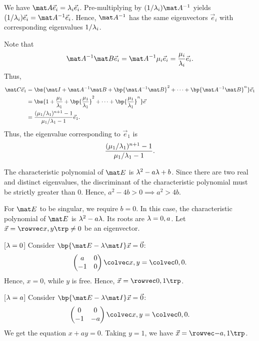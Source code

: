 \begin{solution}
    \begin{ppart}
        \begin{psubpart}
            We have $\mat A \vec e_i = \l_i \vec e_i$. Pre-multiplying by $(1/\l_i) \mat A^{-1}$ yields $(1/\l_i) \vec e_i = \mat A^{-1} \vec e_i$. Hence, $\mat A^{-1}$ has the same eigenvectors $\vec e_i$ with corresponding eigenvalues $1/\lambda_i$.
        \end{psubpart}
        \begin{psubpart}
            Note that \[\mat A^{-1} \mat B \vec e_i = \mat A^{-1} \m_i \vec e_i = \frac{\m_i}{\l_i} \vec e_i.\] Thus,
            \begin{align*}
                \mat C \vec e_1 &= \bs{\mat I + \mat A^{-1} \mat B + \bp{\mat A^{-1} \mat B}^2 + \dots + \bp{\mat A^{-1} \mat B}^n} \vec e_1\\
                &= \bs{1 + \frac{\m_1}{\l_1} + \bp{\frac{\m_1}{\l_1}}^2 + \dots + \bp{\frac{\m_1}{\l_1}}^n} \vec e\\
                &= \frac{(\m_1/\l_1)^{n+1} - 1}{\m_1/\l_1 - 1} \vec e_1.
            \end{align*}
            Thus, the eigenvalue corresponding to $\vec e_1$ is \[\frac{(\mu_1/\lambda_1)^{n+1} - 1}{\mu_1/\lambda_1 - 1}.\]
        \end{psubpart}
    \end{ppart}
    \begin{ppart}
        \begin{psubpart}
            The characteristic polynomial of $\mat E$ is $\lambda^2 - a \lambda + b$. Since there are two real and distinct eigenvalues, the discriminant of the characteristic polynomial must be strictly greater than 0. Hence, $a^2 - 4b > 0 \implies a^2 > 4b$.
        \end{psubpart}
        \begin{psubpart}
            For $\mat E$ to be singular, we require $b = 0$. In this case, the characteristic polynomial of $\mat E$ is $\lambda^2 - a\lambda$. Its roots are $\lambda = 0, a$. Let $\vec x = \cveciix{x}{y} \neq 0$ be an eigenvector.

            [$\lambda = 0$] Consider $\bp{\mat E - \l \mat I} \vec x = \vec 0$: \[\begin{pmatrix}a & 0 \\ -1 & 0 \end{pmatrix}\cvecii{x}{y} = \cvecii00.\] Hence, $x = 0$, while $y$ is free. Hence, $\vec x = \cveciix01$.

            [$\lambda = a$] Consider $\bp{\mat E - \l \mat I} \vec x = \vec 0$: \[\begin{pmatrix}0 & 0 \\ -1 & -a\end{pmatrix} \cvecii{x}{y} = \cvecii00.\] We get the equation $x + ay = 0$. Taking $y = 1$, we have $\vec x = \cveciix{-a}{1}$.


\end{psubpart}
\end{ppart}
\end{solution}
